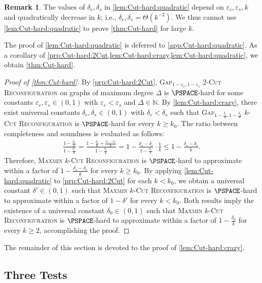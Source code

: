 \documentclass[11pt,fleqn]{article}
\renewcommand{\geq}{\geqslant}
\renewcommand{\leq}{\leqslant}
\renewcommand{\epsilon}{\varepsilon}
\newcommand{\prb}[1]{\textsc{#1}\xspace}
\newcommand{\kCutReconf}{\prb{$k$-Cut Reconfiguration}}
\newcommand{\MMkCutReconf}{\prb{Maxmin $k$-Cut Reconfiguration}}
\newcommand{\twoCutReconf}{\prb{2-Cut Reconfiguration}}
\newcommand{\bbN}{\mathbb{N}}
\theoremstyle{definition}
\newtheorem{remark}[theorem]{Remark}
\numberwithin{equation}{section}
\begin{document}
\begin{remark}
    The values of $\delta_c,\delta_s$ in \cref{lem:Cut-hard:quadratic}
    depend on $\epsilon_c,\epsilon_s,k$ and quadratically decrease in $k$; i.e.,
    $\delta_c,\delta_s = \Theta(k^{-2})$.
    We thus cannot use \cref{lem:Cut-hard:quadratic} to prove \cref{thm:Cut-hard}
    for large $k$.
\end{remark}\noindent
The proof of \cref{lem:Cut-hard:quadratic} is deferred to \cref{app:Cut-hard:quadratic}.
As a corollary of \cref{prp:Cut-hard:2Cut,lem:Cut-hard:crazy,lem:Cut-hard:quadratic},
we obtain \cref{thm:Cut-hard}.


\begin{proof}[Proof of \cref{thm:Cut-hard}]
By \cref{prp:Cut-hard:2Cut},
\prb{Gap$_{1-\epsilon_c,1-\epsilon_s}$ \twoCutReconf}
on graphs of maximum degree $\Delta$
is $\PSPACE$-hard
for some constants $\epsilon_c,\epsilon_s \in (0,1)$ with $\epsilon_c < \epsilon_s$ and
$\Delta \in \bbN$.
By \cref{lem:Cut-hard:crazy},
there exist universal constants $\delta_c,\delta_s \in (0,1)$ with $\delta_c < \delta_s$
such that
\prb{Gap$_{1-\frac{\delta_c}{k}, 1-\frac{\delta_s}{k}}$ \kCutReconf}
is $\PSPACE$-hard for every $k \geq k_0$.
The ratio between completeness and soundness is evaluated as follows:
\begin{align}
    \frac{1-\frac{\delta_s}{k}}{1-\frac{\delta_c}{k}}
    = \frac{1-\frac{\delta_c}{k} + \frac{\delta_c-\delta_s}{k}}{1-\frac{\delta_c}{k}}
    = 1 - \frac{\delta_s - \delta_c}{1-\frac{\delta_c}{3}} \cdot \frac{1}{k}
    \leq 1 - \frac{\delta_s-\delta_c}{k}.
\end{align}
Therefore, \MMkCutReconf is $\PSPACE$-hard to approximate
within a factor of $1 - \frac{\delta_s-\delta_c}{k}$ for every $k \geq k_0$.
By applying \cref{lem:Cut-hard:quadratic} to \cref{prp:Cut-hard:2Cut} for each $k < k_0$,
we obtain a universal constant $\delta' \in (0,1)$ such that
\MMkCutReconf is $\PSPACE$-hard to approximate within a factor of 
$1-\delta'$ for every $k < k_0$.
Both results imply the existence of a universal constant $\delta_0 \in (0,1)$ such that
\MMkCutReconf is $\PSPACE$-hard to approximate within a factor of 
$1-\frac{\delta_0}{k}$ for every $k \geq 2$,
accomplishing the proof.
\end{proof}


The remainder of this section is devoted to the proof of \cref{lem:Cut-hard:crazy}.


\subsection{Three Tests}
\label{sec:Cut-hard:tests}
\end{document}
